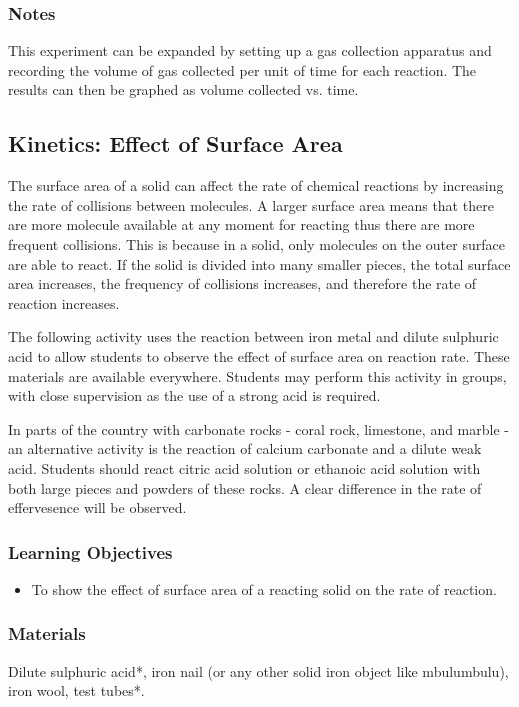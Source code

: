 \subsubsection*{Notes}
This experiment can be expanded by setting up a gas collection apparatus and recording the volume of gas collected per unit of time for each reaction. The results can then be graphed as volume collected vs. time.

\subsection{Kinetics: Effect of Surface Area}

The surface area of a solid can affect the rate of chemical reactions by increasing the rate of collisions between molecules. A larger surface area means that there are more molecule available at any moment for reacting thus there are more frequent collisions. This is because in a solid, only molecules on the outer surface are able to react. If the solid is divided into many smaller pieces, the total surface area increases, the frequency of collisions increases, and therefore the rate of reaction increases.

The following activity uses the reaction between iron metal and dilute sulphuric acid to allow students to observe the effect of surface area on reaction rate. These materials are available everywhere. Students may perform this activity in groups, with close supervision as the use of a strong acid is required.

In parts of the country with carbonate rocks - coral rock, limestone, and marble - an alternative activity is the reaction of calcium carbonate and a dilute weak acid. Students should react citric acid solution or ethanoic acid solution with both large pieces and powders of these rocks. A clear difference in the rate of effervesence will be observed.

\subsubsection*{Learning Objectives}
\begin{itemize}
\item{To show the effect of surface area of a reacting solid on the rate of reaction.}
\end{itemize}

\subsubsection*{Materials}
Dilute sulphuric acid*, iron nail (or any other solid iron object like mbulumbulu), iron wool, test tubes*.

